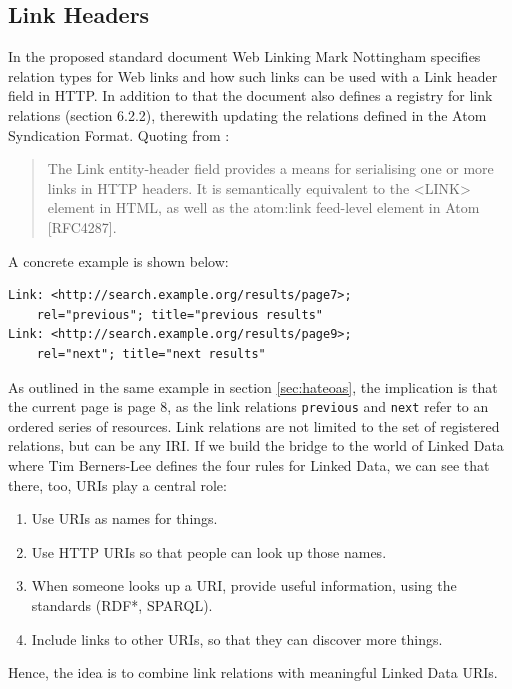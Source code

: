 \documentclass{acm_proc_article-sp}
\begin{document}
\subsection{Link Headers}\label{sec:linkheaders}
In the proposed standard document Web Linking\cite{Link:Headers} Mark Nottingham specifies relation types for Web links and how such links can be used with a Link header field in HTTP. In addition to that the document also defines a registry for link relations (section 6.2.2), therewith updating the relations defined in the Atom Syndication Format. Quoting from \cite{Link:Headers}:
\begin{quote}
The Link entity-header field provides a means for serialising one or more links in HTTP headers.  It is semantically equivalent to the <LINK> element in HTML, as well as the atom:link feed-level element in Atom [RFC4287].
\end{quote}
A concrete example is shown below:
\begin{verbatim}
Link: <http://search.example.org/results/page7>;
    rel="previous"; title="previous results"
Link: <http://search.example.org/results/page9>;
    rel="next"; title="next results"
\end{verbatim}
As outlined in the same example in section \ref{sec:hateoas}, the implication is that the current page is page 8, as the link relations \texttt{previous} and \texttt{next} refer to an ordered series of resources. Link relations are not limited to the set of registered relations, but can be any IRI. If we build the bridge to the world of Linked Data\cite{TimBL:LinkedData} where Tim Berners-Lee defines the four rules for Linked Data, we can see that there, too, URIs play a central role:
\begin{enumerate}
\item Use URIs as names for things.
\item Use HTTP URIs so that people can look up those names.
\item When someone looks up a URI, provide useful information, using the standards (RDF*, SPARQL).
\item Include links to other URIs, so that they can discover more things.
\end{enumerate}
Hence, the idea is to combine link relations with meaningful Linked Data URIs.
\end{document}
